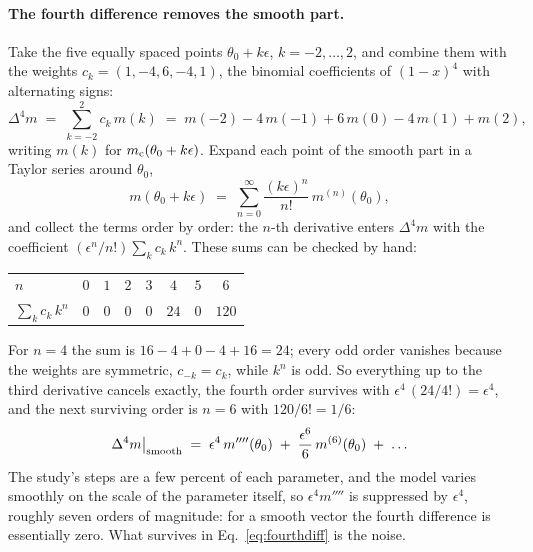 \documentclass[11pt]{article}
\begin{document}
\paragraph{The fourth difference removes the smooth part.}
Take the five equally spaced points $\theta_0 + k\epsilon$,
$k = -2, \ldots, 2$, and combine them with the weights
$c_k = (1, -4, 6, -4, 1)$, the binomial coefficients of $(1 - x)^4$
with alternating signs:
\begin{equation}
  \Delta^4 m \;=\; \sum_{k=-2}^{2} c_k\, m(k)
  \;=\; m(-2) - 4\,m(-1) + 6\,m(0) - 4\,m(1) + m(2),
  \label{eq:fourthdiff}
\end{equation}
writing $m(k)$ for $m_{\rm c}(\theta_0 + k\epsilon)$.  Expand each
point of the smooth part in a Taylor series around $\theta_0$,
\begin{equation}
  m(\theta_0 + k\epsilon) \;=\; \sum_{n=0}^{\infty}
  \frac{(k\epsilon)^n}{n!}\, m^{(n)}(\theta_0),
  \label{eq:taylor}
\end{equation}
and collect the terms order by order: the $n$-th derivative enters
$\Delta^4 m$ with the coefficient $(\epsilon^n/n!)\sum_k c_k\,k^n$.
These sums can be checked by hand:
\begin{center}
  \begin{tabular}{lccccccc}
    \hline
    $n$ & $0$ & $1$ & $2$ & $3$ & $4$ & $5$ & $6$ \\
    $\sum_k c_k\,k^n$ & $0$ & $0$ & $0$ & $0$ & $24$ & $0$ & $120$ \\
    \hline
  \end{tabular}
\end{center}
For $n = 4$ the sum is $16 - 4 + 0 - 4 + 16 = 24$; every odd order
vanishes because the weights are symmetric, $c_{-k} = c_k$, while
$k^n$ is odd.  So everything up to the third derivative cancels
exactly, the fourth order survives with $\epsilon^4\,(24/4!) =
\epsilon^4$, and the next surviving order is $n = 6$ with
$120/6! = 1/6$:
\begin{equation}
  \Delta^4 m\big|_{\rm smooth} \;=\;
  \epsilon^4\, m''''(\theta_0)
  \;+\; \frac{\epsilon^6}{6}\, m^{(6)}(\theta_0) \;+\; \ldots
  \label{eq:smoothpart}
\end{equation}
The study's steps are a few percent of each parameter, and the model
varies smoothly on the scale of the parameter itself, so
$\epsilon^4 m''''$ is suppressed by $\epsilon^4$, roughly seven orders
of magnitude: for a smooth vector the fourth difference is essentially
zero.  What survives in Eq.~\eqref{eq:fourthdiff} is the noise.
\end{document}
